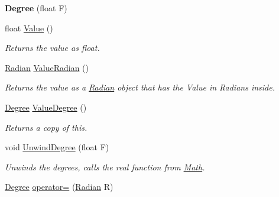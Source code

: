 \begin{DoxyCompactItemize}
\item 
\hypertarget{classrcz_engine_1_1_degree_aa4bbab5067c82840d13b5ca971238a3f}{}{\bfseries Degree} (float F)\label{classrcz_engine_1_1_degree_aa4bbab5067c82840d13b5ca971238a3f}

\item 
\hypertarget{classrcz_engine_1_1_degree_af2cc95bf0b4842047b790ecc2187599a}{}float \hyperlink{classrcz_engine_1_1_degree_af2cc95bf0b4842047b790ecc2187599a}{Value} ()\label{classrcz_engine_1_1_degree_af2cc95bf0b4842047b790ecc2187599a}

\begin{DoxyCompactList}\small\item\em Returns the value as float. \end{DoxyCompactList}\item 
\hypertarget{classrcz_engine_1_1_degree_a73363031ee4762772242ff7fc0499ffa}{}\hyperlink{classrcz_engine_1_1_radian}{Radian} \hyperlink{classrcz_engine_1_1_degree_a73363031ee4762772242ff7fc0499ffa}{Value\+Radian} ()\label{classrcz_engine_1_1_degree_a73363031ee4762772242ff7fc0499ffa}

\begin{DoxyCompactList}\small\item\em Returns the value as a \hyperlink{classrcz_engine_1_1_radian}{Radian} object that has the Value in Radians inside. \end{DoxyCompactList}\item 
\hypertarget{classrcz_engine_1_1_degree_ab45e78fb5f33b9c1ccb590cc817634c0}{}\hyperlink{classrcz_engine_1_1_degree}{Degree} \hyperlink{classrcz_engine_1_1_degree_ab45e78fb5f33b9c1ccb590cc817634c0}{Value\+Degree} ()\label{classrcz_engine_1_1_degree_ab45e78fb5f33b9c1ccb590cc817634c0}

\begin{DoxyCompactList}\small\item\em Returns a copy of this. \end{DoxyCompactList}\item 
\hypertarget{classrcz_engine_1_1_degree_ae7e7c36bb5c6e46af2649ab0e7385bef}{}void \hyperlink{classrcz_engine_1_1_degree_ae7e7c36bb5c6e46af2649ab0e7385bef}{Unwind\+Degree} (float F)\label{classrcz_engine_1_1_degree_ae7e7c36bb5c6e46af2649ab0e7385bef}

\begin{DoxyCompactList}\small\item\em Unwinds the degrees, calls the real function from \hyperlink{classrcz_engine_1_1_math}{Math}. \end{DoxyCompactList}\item 
\hypertarget{classrcz_engine_1_1_degree_af934655c3435d8310ebbd354532c48e3}{}\hyperlink{classrcz_engine_1_1_degree}{Degree} \hyperlink{classrcz_engine_1_1_degree_af934655c3435d8310ebbd354532c48e3}{operator=} (\hyperlink{classrcz_engine_1_1_radian}{Radian} R)\label{classrcz_engine_1_1_degree_af934655c3435d8310ebbd354532c48e3}


\end{DoxyCompactItemize}
